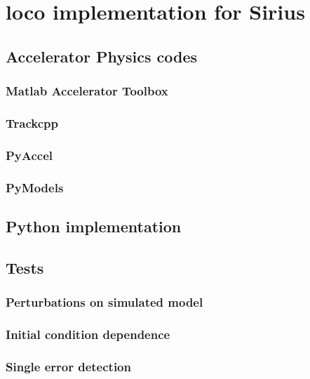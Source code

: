 \chapter{\gls{loco} implementation for Sirius}

\section{Accelerator Physics codes}

\subsection{Matlab Accelerator Toolbox}
\subsection{Trackcpp}
\subsection{PyAccel}
\subsection{PyModels}


\section{Python implementation}

\section{Tests}

\subsection{Perturbations on simulated model}

\subsection{Initial condition dependence}

\subsection{Single error detection}






